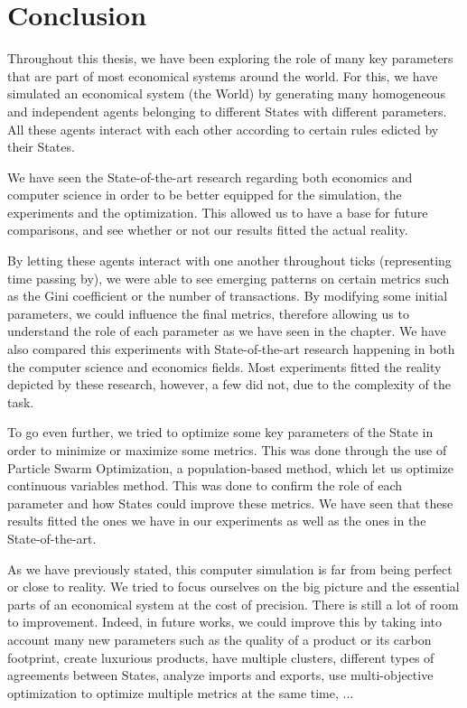 \chapter{Conclusion}

Throughout this thesis, we have been exploring the role of many key parameters that are part of most economical systems around the world. For this, we have simulated an economical system (the World) by generating many homogeneous and independent agents belonging to different States with different parameters. All these agents interact with each other according to certain rules edicted by their States. 

We have seen the State-of-the-art research regarding both economics and computer science in order to be better equipped for the simulation, the experiments and the optimization. This allowed us to have a base for future comparisons, and see whether or not our results fitted the actual reality.

By letting these agents interact with one another throughout ticks (representing time passing by), we were able to see emerging patterns on certain metrics such as the Gini coefficient or the number of transactions. By modifying some initial parameters, we could influence the final metrics, therefore allowing us to understand the role of each parameter as we have seen in the  chapter. We have also compared this experiments with State-of-the-art research happening in both the computer science and economics fields. Most experiments fitted the reality depicted by these research, however, a few did not, due to the complexity of the task.

To go even further, we tried to optimize some key parameters of the State in order to minimize or maximize some metrics. This was done through the use of Particle Swarm Optimization, a population-based method, which let us optimize continuous variables method. This was done to confirm the role of each parameter and how States could improve these metrics. We have seen that these results fitted the ones we have in our experiments as well as the ones in the State-of-the-art.

As we have previously stated, this computer simulation is far from being perfect or close to reality. We tried to focus ourselves on the big picture and the essential parts of an economical system at the cost of precision. There is still a lot of room to improvement. Indeed, in future works, we could improve this by taking into account many new parameters such as the quality of a product or its carbon footprint,  create luxurious products, have multiple clusters, different types of agreements between States, analyze imports and exports, use multi-objective optimization to optimize multiple metrics at the same time, ...
